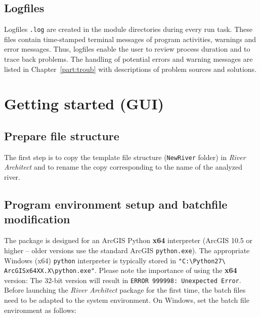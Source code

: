 \subsection{Logfiles}
Logfiles \texttt{.log} are created in the module directories during every run task. These files contain time-stamped terminal messages of program activities, warnings and error messages. Thus, logfiles enable the user to review process duration and to trace back problems. The handling of potential errors and warning messages are listed in Chapter~\ref{part:troub} with descriptions of problem sources and solutions.

\section{Getting started (GUI)}\label{sec:gui}

\subsection{Prepare file structure}\label{sec:prepdir}
The first step is to copy the template file structure (\texttt{NewRiver} folder) in \textit{River Architect} and to rename the copy corresponding to the name of the analyzed river.

\subsection{Program environment setup and batchfile modification}
The package is designed for an ArcGIS Python \textbf{x64} interpreter (ArcGIS 10.5 or higher -- older versions use the standard ArcGIS \texttt{python.exe}). The appropriate Windows (x64) \texttt{python} interpreter is typically stored in \texttt{"C:{\textbackslash}Python27{\textbackslash} ArcGISx64XX.X{\textbackslash}python.exe"}. Please note the importance of using the \textbf{x64} version: The 32-bit version will result in \texttt{ERROR 999998: Unexpected Error}.\\

Before launching the \textit{River Architect} package for the first time, the batch files need to be adapted to the system environment. On Windows, set the batch file environment as follows:

